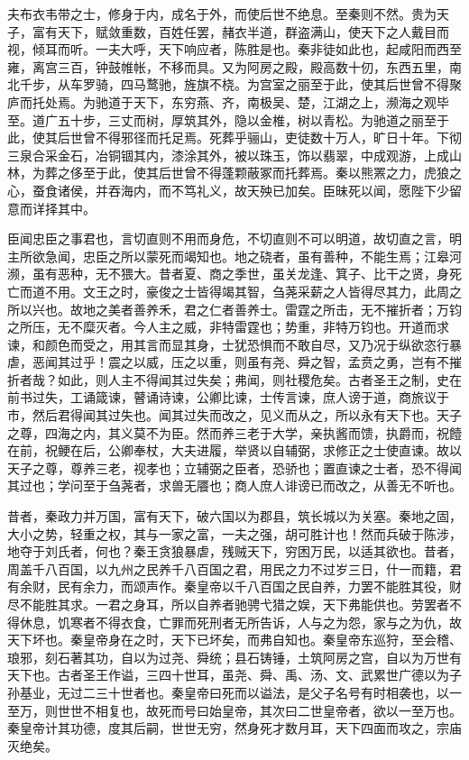\documentclass[12pt,UTF8]{ctexbook}
\begin{document}
夫布衣韦带之士，修身于内，成名于外，而使后世不绝息。至秦则不然。贵为天子，富有天下，赋敛重数，百姓任罢，赭衣半道，群盗满山，使天下之人戴目而视，倾耳而听。一夫大呼，天下响应者，陈胜是也。秦非徒如此也，起咸阳而西至雍，离宫三百，钟鼓帷帐，不移而具。又为阿房之殿，殿高数十仞，东西五里，南北千步，从车罗骑，四马鹜驰，旌旗不桡。为宫室之丽至于此，使其后世曾不得聚庐而托处焉。为驰道于天下，东穷燕、齐，南极吴、楚，江湖之上，濒海之观毕至。道广五十步，三丈而树，厚筑其外，隐以金椎，树以青松。为驰道之丽至于此，使其后世曾不得邪径而托足焉。死葬乎骊山，吏徒数十万人，旷日十年。下彻三泉合采金石，冶铜锢其内，漆涂其外，被以珠玉，饰以翡翠，中成观游，上成山林，为葬之侈至于此，使其后世曾不得蓬颗蔽冢而托葬焉。秦以熊罴之力，虎狼之心，蚕食诸侯，并吞海内，而不笃礼义，故天殃已加矣。臣昧死以闻，愿陛下少留意而详择其中。



臣闻忠臣之事君也，言切直则不用而身危，不切直则不可以明道，故切直之言，明主所欲急闻，忠臣之所以蒙死而竭知也。地之硗者，虽有善种，不能生焉；江皋河濒，虽有恶种，无不猥大。昔者夏、商之季世，虽关龙逢、箕子、比干之贤，身死亡而道不用。文王之时，豪俊之士皆得竭其智，刍荛采薪之人皆得尽其力，此周之所以兴也。故地之美者善养禾，君之仁者善养士。雷霆之所击，无不摧折者；万钧之所压，无不糜灭者。今人主之威，非特雷霆也；势重，非特万钧也。开道而求谏，和颜色而受之，用其言而显其身，士犹恐惧而不敢自尽，又乃况于纵欲恣行暴虐，恶闻其过乎！震之以威，压之以重，则虽有尧、舜之智，孟贲之勇，岂有不摧折者哉？如此，则人主不得闻其过失矣；弗闻，则社稷危矣。古者圣王之制，史在前书过失，工诵箴谏，瞽诵诗谏，公卿比谏，士传言谏，庶人谤于道，商旅议于市，然后君得闻其过失也。闻其过失而改之，见义而从之，所以永有天下也。天子之尊，四海之内，其义莫不为臣。然而养三老于大学，亲执酱而馈，执爵而，祝饐在前，祝鲠在后，公卿奉杖，大夫进履，举贤以自辅弼，求修正之士使直谏。故以天子之尊，尊养三老，视孝也；立辅弼之臣者，恐骄也；置直谏之士者，恐不得闻其过也；学问至于刍荛者，求兽无餍也；商人庶人诽谤已而改之，从善无不听也。



昔者，秦政力并万国，富有天下，破六国以为郡县，筑长城以为关塞。秦地之固，大小之势，轻重之权，其与一家之富，一夫之强，胡可胜计也！然而兵破于陈涉，地夺于刘氏者，何也？秦王贪狼暴虐，残贼天下，穷困万民，以适其欲也。昔者，周盖千八百国，以九州之民养千八百国之君，用民之力不过岁三日，什一而籍，君有余财，民有余力，而颂声作。秦皇帝以千八百国之民自养，力罢不能胜其役，财尽不能胜其求。一君之身耳，所以自养者驰骋弋猎之娱，天下弗能供也。劳罢者不得休息，饥寒者不得衣食，亡罪而死刑者无所告诉，人与之为怨，家与之为仇，故天下坏也。秦皇帝身在之时，天下已坏矣，而弗自知也。秦皇帝东巡狩，至会稽、琅邪，刻石著其功，自以为过尧、舜统；县石铸锤，土筑阿房之宫，自以为万世有天下也。古者圣王作谥，三四十世耳，虽尧、舜、禹、汤、文、武累世广德以为子孙基业，无过二三十世者也。秦皇帝曰死而以谥法，是父子名号有时相袭也，以一至万，则世世不相复也，故死而号曰始皇帝，其次曰二世皇帝者，欲以一至万也。秦皇帝计其功德，度其后嗣，世世无穷，然身死才数月耳，天下四面而攻之，宗庙灭绝矣。
\end{document}
